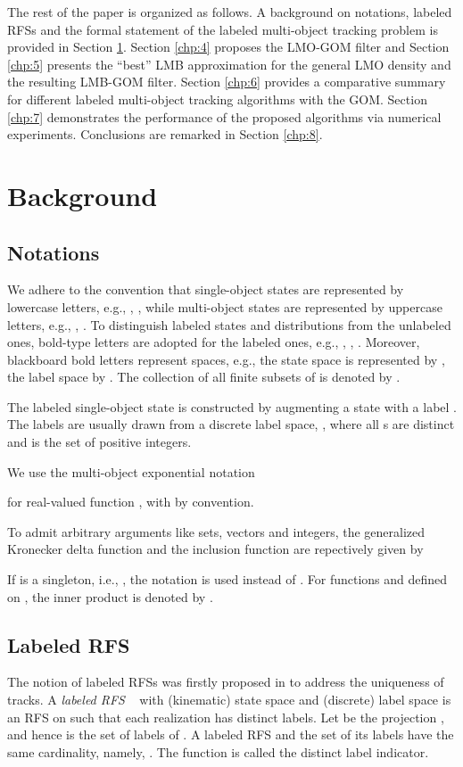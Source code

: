 \documentclass[journal]{IEEEtran}
\begin{document}
The rest of the paper is organized as follows. A background on  notations,  labeled RFSs and the formal statement of the labeled multi-object tracking problem is provided in Section \ref{chp:2}. Section \ref{chp:4} proposes the LMO-GOM filter and Section \ref{chp:5} presents the ``best'' LMB  approximation for the general LMO density and the resulting LMB-GOM filter. Section \ref{chp:6} provides a comparative summary for different labeled multi-object tracking algorithms with the GOM.  Section \ref{chp:7} demonstrates the performance of the proposed algorithms via numerical experiments. Conclusions are remarked in Section \ref{chp:8}.

\section{Background}\label{chp:2}
\subsection{Notations}
We adhere to the convention that single-object states are
represented by lowercase letters, e.g., , , while multi-object
states are represented by uppercase letters, e.g., , .  To distinguish labeled states and distributions from the
unlabeled ones, bold-type letters are adopted for the labeled
ones, e.g., , , . Moreover, blackboard bold letters represent spaces, e.g., the
state space is represented by , the label space by . The collection of all finite subsets of 
is denoted by .

The labeled single-object state  is constructed by augmenting
a state  with a label . The labels are usually
drawn from a discrete label space, , where
all s are distinct and   is the set of positive
integers.

We use the multi-object exponential notation

for real-valued function , with  by convention.

To admit arbitrary arguments like sets, vectors and integers, the generalized Kronecker delta function and the inclusion function are repectively given by

If  is a singleton, i.e., , the notation  is used instead of . For functions  and  defined on , the inner product is denoted by
.

\subsection{Labeled RFS}
The notion of labeled RFSs was firstly proposed in \cite{refr:label_1} to address the uniqueness of tracks.   A \textit{labeled RFS} ~\cite{refr:label_1,refr:label_2} with (kinematic) state space  and (discrete) label space
  is an RFS on  such that each realization  has distinct labels. Let  be the projection , and hence  is the set of labels of . A labeled RFS and the set of its labels have the same cardinality, namely, . The function  is called the distinct label indicator.
\end{document}
